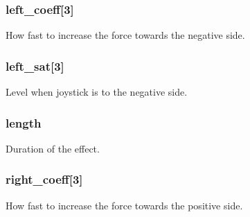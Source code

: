 \subsubsection[{\texorpdfstring{left\+\_\+coeff}{left_coeff}}]{ left\+\_\+coeff\mbox{[}3\mbox{]}}\hypertarget{struct_s_d_l___haptic_condition_add2cf04cbb890bd65f148d14a299fa96}{}\label{struct_s_d_l___haptic_condition_add2cf04cbb890bd65f148d14a299fa96}
How fast to increase the force towards the negative side. 
\subsubsection[{\texorpdfstring{left\+\_\+sat}{left_sat}}]{ left\+\_\+sat\mbox{[}3\mbox{]}}\hypertarget{struct_s_d_l___haptic_condition_a688464086e8f5b3fb30c63c687c90fd6}{}\label{struct_s_d_l___haptic_condition_a688464086e8f5b3fb30c63c687c90fd6}
Level when joystick is to the negative side. 
\subsubsection[{\texorpdfstring{length}{length}}]{ length}\hypertarget{struct_s_d_l___haptic_condition_afbde362d49894774c8b9c9e85ac0a913}{}\label{struct_s_d_l___haptic_condition_afbde362d49894774c8b9c9e85ac0a913}
Duration of the effect. 
\subsubsection[{\texorpdfstring{right\+\_\+coeff}{right_coeff}}]{ right\+\_\+coeff\mbox{[}3\mbox{]}}\hypertarget{struct_s_d_l___haptic_condition_aba08b5cf32eaa731813117458dca7710}{}\label{struct_s_d_l___haptic_condition_aba08b5cf32eaa731813117458dca7710}
How fast to increase the force towards the positive side. 
